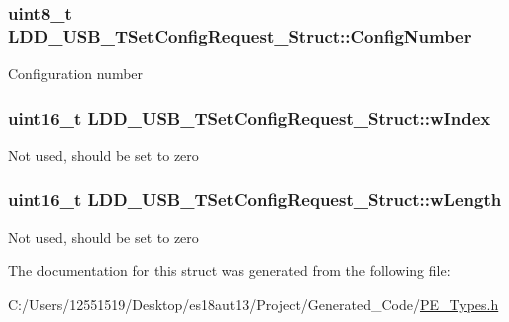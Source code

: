 \subsubsection[{Config\+Number}]{\setlength{\rightskip}{0pt plus 5cm}uint8\+\_\+t L\+D\+D\+\_\+\+U\+S\+B\+\_\+\+T\+Set\+Config\+Request\+\_\+\+Struct\+::\+Config\+Number}\label{struct_l_d_d___u_s_b___t_set_config_request___struct_a9a545d7858a7ee85dbe37eaf2b4b7e01}
Configuration number \hypertarget{struct_l_d_d___u_s_b___t_set_config_request___struct_ad2aa2851b128777e842b2ac796d2f664}{}
\subsubsection[{w\+Index}]{\setlength{\rightskip}{0pt plus 5cm}uint16\+\_\+t L\+D\+D\+\_\+\+U\+S\+B\+\_\+\+T\+Set\+Config\+Request\+\_\+\+Struct\+::w\+Index}\label{struct_l_d_d___u_s_b___t_set_config_request___struct_ad2aa2851b128777e842b2ac796d2f664}
Not used, should be set to zero \hypertarget{struct_l_d_d___u_s_b___t_set_config_request___struct_a66312977eb5816459d0201a2bacaf9b5}{}
\subsubsection[{w\+Length}]{\setlength{\rightskip}{0pt plus 5cm}uint16\+\_\+t L\+D\+D\+\_\+\+U\+S\+B\+\_\+\+T\+Set\+Config\+Request\+\_\+\+Struct\+::w\+Length}\label{struct_l_d_d___u_s_b___t_set_config_request___struct_a66312977eb5816459d0201a2bacaf9b5}
Not used, should be set to zero 

The documentation for this struct was generated from the following file\+:\begin{DoxyCompactItemize}
\item 
C\+:/\+Users/12551519/\+Desktop/es18aut13/\+Project/\+Generated\+\_\+\+Code/\hyperlink{_p_e___types_8h}{P\+E\+\_\+\+Types.\+h}\end{DoxyCompactItemize}
